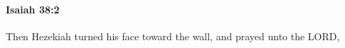 
		\paragraph{Isaiah 38:2} %
			\label{ISAIAH-38-2}

			Then Hezekiah turned his face toward the wall, and prayed unto the LORD,



